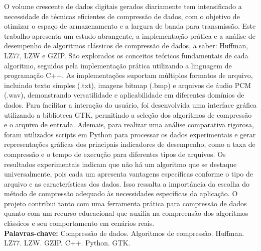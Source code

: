 \documentclass[
	12pt,				%
	openright,			%
	oneside,			%
	a4paper,			%
	english,			%
	french,				%
	spanish,			%
	brazil,				%
	]{lib/abntex2}
\begin{document}

\setlength{\absparsep}{18pt} %
\begin{resumo}
O volume crescente de dados digitais gerados diariamente tem intensificado a necessidade de técnicas eficientes de compressão de dados, com o objetivo de otimizar o espaço de armazenamento e a largura de banda para transmissão. Este trabalho apresenta um estudo abrangente, a implementação prática e a análise de desempenho de algoritmos clássicos de compressão de dados, a saber: Huffman, LZ77, LZW e GZIP. São explorados os conceitos teóricos fundamentais de cada algoritmo, seguidos pela implementação prática utilizando a linguagem de programação C++. As implementações suportam múltiplos formatos de arquivo, incluindo texto simples (.txt), imagens bitmap (.bmp) e arquivos de áudio PCM (.wav), demonstrando versatilidade e aplicabilidade em diferentes domínios de dados.
Para facilitar a interação do usuário, foi desenvolvida uma interface gráfica utilizando a biblioteca GTK, permitindo a seleção dos algoritmos de compressão e o arquivo de entrada. Ademais, para realizar uma análise comparativa rigorosa, foram utilizados scripts em Python para processar os dados experimentais e gerar representações gráficas dos principais indicadores de desempenho, como a taxa de compressão e o tempo de execução para diferentes tipos de arquivos.
Os resultados experimentais indicam que não há um algoritmo que se destaque universalmente, pois cada um apresenta
vantagens específicas conforme o tipo de arquivo e as características dos dados. Isso ressalta a importância da escolha
do método de compressão adequado às necessidades específicas da aplicação. O projeto contribui tanto com uma ferramenta
prática para compressão de dados quanto com um recurso educacional que auxilia na compreensão dos algoritmos clássicos e
seu comportamento em cenários reais.\\
        \textbf{Palavras-chave:} Compressão de dados. Algoritmos de compressão. Huffman. LZ77. LZW. GZIP. C++. Python. GTK.
\end{resumo}
\end{document}
